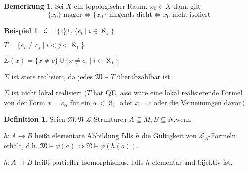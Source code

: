 \documentclass[12pt,parskip=full]{scrartcl}
\theoremstyle{definition}
\newtheorem{definition}[theorem]{Definition}
\newtheorem{example}[theorem]{Beispiel}
\newtheorem{remark}[theorem]{Bemerkung}
\begin{document}
	\begin{remark}
		Sei $X$ ein topologischer Raum, $x_0 \in X$ dann gilt
		\begin{equation*}
			\{ x_0 \} \text{ mager} \Leftrightarrow \{ x_0 \} \text{ nirgends dicht} \Leftrightarrow \text{$x_0$ nicht isoliert}
		\end{equation*}
	\end{remark}

	\begin{example}
		$\mathcal{L} = \{ c \} \cup \{ c_i \mid i \in \aleph_1 \}$
		
		$T = \{ c_i \neq c_j \mid i < j < \aleph_1 \}$
		
		$\Sigma(x) = \{ x \neq c \} \cup \{ x \neq c_i \mid i \in \aleph_0 \}$
		
		$\Sigma$ ist stets realisiert, da jedes $\mathfrak{M} \models T$ überabzählbar ist.
		
		$\Sigma$ ist nicht lokal realisiert ($T$ hat QE, also wäre eine lokal realisierende Formel von der Form $x = x_\alpha$ für ein $\alpha < \aleph_1$ oder $x = c$ oder die Verneinungen davon)
	\end{example}

	\begin{definition}
		Seien $\mathfrak{M}, \mathfrak{N}$ $\mathcal{L}$-Strukturen $A \subseteq M, B \subseteq N$.wenn
		
		$h: A \to B$ heißt elementare Abbildung falls $h$ die Gültigkeit von $\mathcal{L}_A$-Formeln erhält, d.h. $\mathfrak{M} \models \varphi(\overline{a}) \Leftrightarrow \mathfrak{N} \models \varphi(h(\overline{a}))$.
		
		$h: A \to B$ heißt partieller Isomorphismus, falls $h$ elementar und bijektiv ist.
	\end{definition}
\end{document}
